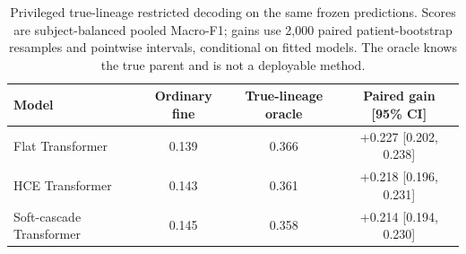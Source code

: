 \begin{table}[H]
\centering\small
\setlength{\tabcolsep}{5pt}
\begin{tabular}{lccc}
\toprule
Model & Ordinary fine & True-lineage oracle & Paired gain [95\% CI] \\
\midrule
Flat Transformer & 0.139 & 0.366 & +0.227 [0.202, 0.238] \\
HCE Transformer & 0.143 & 0.361 & +0.218 [0.196, 0.231] \\
Soft-cascade Transformer & 0.145 & 0.358 & +0.214 [0.194, 0.230] \\
\bottomrule
\end{tabular}
\caption{Privileged true-lineage restricted decoding on the same frozen
predictions. Scores are subject-balanced pooled Macro-F1; gains use 2{,}000
paired patient-bootstrap resamples and pointwise intervals, conditional on
fitted models. The oracle knows the true parent and is not a deployable method.}
\label{tab:true_lineage_oracle}
\end{table}
